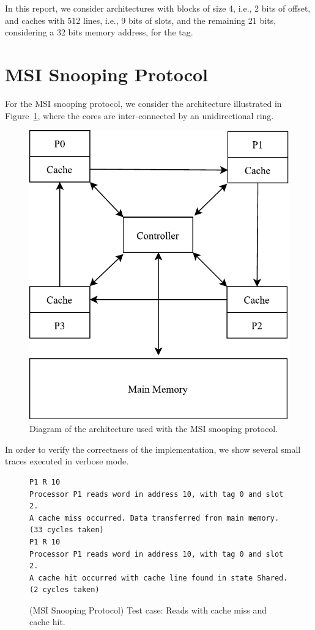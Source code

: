 \documentclass[12pt, a4paper, twoside]{article}
\begin{document}
In this report, we consider architectures with blocks of size 4, i.e., 2 bits of offset,
and caches with 512 lines, i.e., 9 bits of slots, and the remaining 21 bits,
considering a 32 bits memory address, for the tag.

\section{MSI Snooping Protocol} \label{sec:msi-snooping}

For the MSI snooping protocol, we consider the architecture illustrated in Figure~\ref{fig:msi-arch},
where the cores are inter-connected by an unidirectional ring.

\begin{figure}[h]
\centering
\includegraphics{figs/MSISnoopingCache.pdf}
\caption{Diagram of the architecture used with the MSI snooping protocol.}
\label{fig:msi-arch}
\end{figure}

In order to verify the correctness of the implementation, we show several small
traces executed in verbose mode.

\begin{figure}[h]
\begin{verbatim}
P1 R 10
Processor P1 reads word in address 10, with tag 0 and slot 2.
A cache miss occurred. Data transferred from main memory.
(33 cycles taken)
P1 R 10
Processor P1 reads word in address 10, with tag 0 and slot 2.
A cache hit occurred with cache line found in state Shared.
(2 cycles taken)
\end{verbatim}
\caption{(MSI Snooping Protocol) Test case: Reads with cache miss and cache hit.}
\end{figure}
\end{document}
